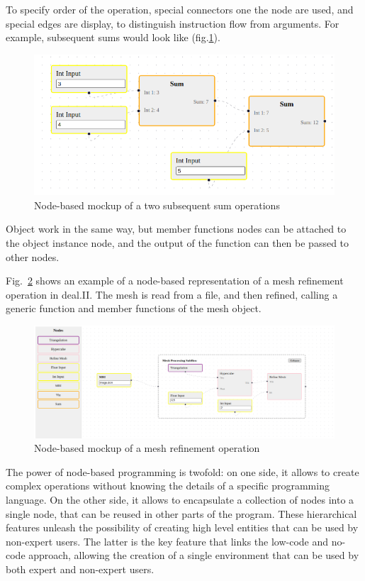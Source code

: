 \documentclass[a4paper,12pt]{article}
\begin{document}
To specify order of the operation, special connectors one the node are used, and special edges are display, to distinguish instruction flow from arguments. For example, subsequent sums would look like (fig.\ref{twosum}).

\begin{figure}
    \label{twosum}
    \includegraphics[width=400pt]{twosum.png}
    \caption{Node-based mockup of a two subsequent sum operations}
\end{figure}
    

Object work in the same way, but member functions nodes can be attached to the object instance node, and the output of the function can then be passed to other nodes.

Fig.~\ref{refine} shows an example of a node-based representation of a mesh refinement operation in deal.II. The mesh is read from a file, and then refined, calling a generic function and member functions of the mesh object.
\begin{figure}
    \includegraphics[width=400pt]{refine.png}
    \caption{Node-based mockup of a mesh refinement operation}
    \label{refine}
\end{figure}


The power of node-based programming is twofold: on one side, it allows to create complex operations without knowing the details of a specific programming language. On the other side, it allows to encapsulate a collection of nodes into a single node, that can be reused in other parts of the program. These hierarchical features unleash the possibility of creating high level entities that can be used by non-expert users. The latter is the key feature that links the low-code and no-code approach, allowing the creation of a single environment that can be used by both expert and non-expert users.
\end{document}

